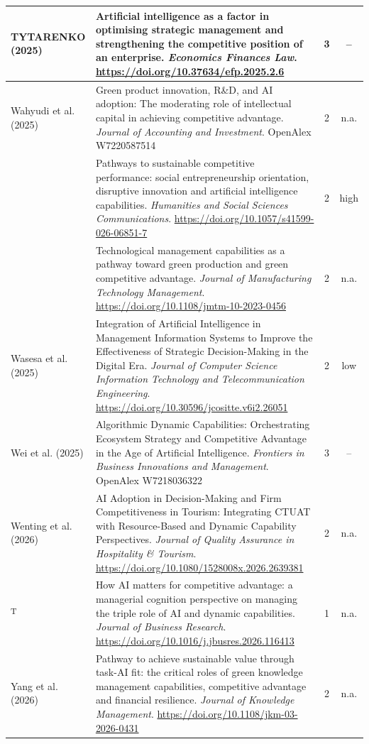 {\begin{longtable}{|>{\raggedright\arraybackslash}p{2.6cm}|>{\raggedright\arraybackslash}p{10.2cm}|c|c|}
TYTARENKO (2025) & Artificial intelligence as a factor in optimising strategic management and strengthening the competitive position of an enterprise. \textit{Economics Finances Law}. \url{https://doi.org/10.37634/efp.2025.2.6} & 3 & -- \\ \hline
Wahyudi et al. (2025) & Green product innovation, R\&D, and AI adoption: The moderating role of intellectual capital in achieving competitive advantage. \textit{Journal of Accounting and Investment}. OpenAlex W7220587514 & 2 & n.a. \\ \hline
\textcite{wang2026} & Pathways to sustainable competitive performance: social entrepreneurship orientation, disruptive innovation and artificial intelligence capabilities. \textit{Humanities and Social Sciences Communications}. \url{https://doi.org/10.1057/s41599-026-06851-7} & 2 & high \\ \hline
\textcite{waqas2024} & Technological management capabilities as a pathway toward green production and green competitive advantage. \textit{Journal of Manufacturing Technology Management}. \url{https://doi.org/10.1108/jmtm-10-2023-0456} & 2 & n.a. \\ \hline
Wasesa et al. (2025) & Integration of Artificial Intelligence in Management Information Systems to Improve the Effectiveness of Strategic Decision-Making in the Digital Era. \textit{Journal of Computer Science Information Technology and Telecommunication Engineering}. \url{https://doi.org/10.30596/jcositte.v6i2.26051} & 2 & low \\ \hline
Wei et al. (2025) & Algorithmic Dynamic Capabilities: Orchestrating Ecosystem Strategy and Competitive Advantage in the Age of Artificial Intelligence. \textit{Frontiers in Business Innovations and Management}. OpenAlex W7218036322 & 3 & -- \\ \hline
Wenting et al. (2026) & AI Adoption in Decision-Making and Firm Competitiveness in Tourism: Integrating CTUAT with Resource-Based and Dynamic Capability Perspectives. \textit{Journal of Quality Assurance in Hospitality \& Tourism}. \url{https://doi.org/10.1080/1528008x.2026.2639381} & 2 & n.a. \\ \hline
\textcite{wu2026}\textsuperscript{T} & How AI matters for competitive advantage: a managerial cognition perspective on managing the triple role of AI and dynamic capabilities. \textit{Journal of Business Research}. \url{https://doi.org/10.1016/j.jbusres.2026.116413} & 1 & n.a. \\ \hline
Yang et al. (2026) & Pathway to achieve sustainable value through task-AI fit: the critical roles of green knowledge management capabilities, competitive advantage and financial resilience. \textit{Journal of Knowledge Management}. \url{https://doi.org/10.1108/jkm-03-2026-0431} & 2 & n.a. \\ \hline

\end{longtable}}
